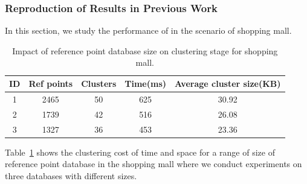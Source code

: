 \subsubsection{Reproduction of Results in Previous Work}
In this section, we study the performance of \oursystem in the scenario of shopping mall.
\begin{table}[!htbp]
\centering
\begin{tabular}{ccccc}
\hline
ID &Ref points &Clusters &Time(ms) & \begin{minipage}{2cm}Average cluster size(KB) \end{minipage}\\
\hline
1 &2465 &50 &625 &30.92\\
2 &1739 &42 &516 &26.08\\
3 &1327 &36 &453 &23.36\\
\hline
\end{tabular}
\caption{\label{tab_mall_cluster}Impact of reference point database size on clustering stage for shopping mall.}
\end{table}
Table~\ref{tab_mall_cluster} shows the clustering cost of time and space for a range of size of reference point database in the shopping mall where we conduct experiments on three databases with different sizes.


